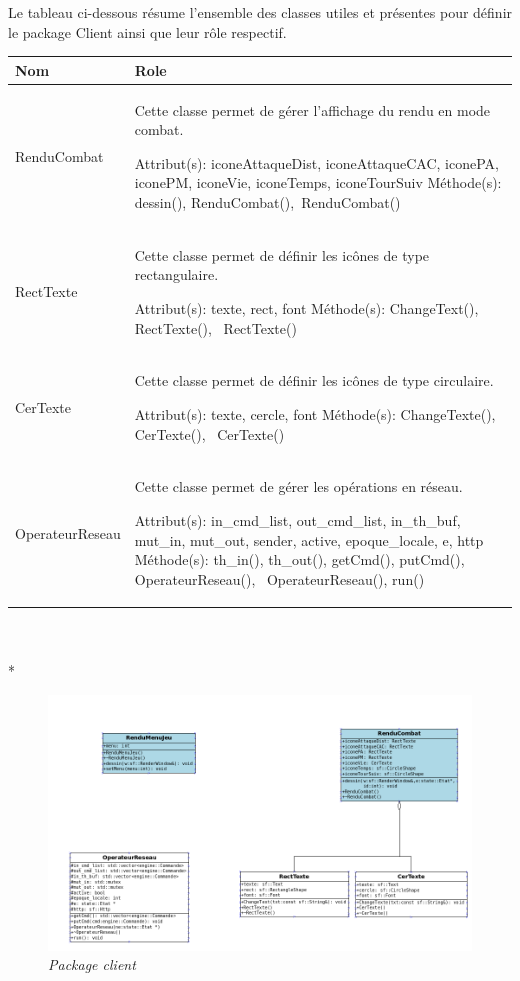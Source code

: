\documentclass[11pt, a4paper]{article}
\begin{document}
Le tableau ci-dessous résume l'ensemble des classes utiles et présentes pour définir le package Client ainsi que leur rôle respectif.\\

\begin{tabularx}{\textwidth}{ |l|X| }
\hline
   \textbf{Nom} & \textbf{Role}
 \\
\hline

   RenduCombat & Cette classe permet de gérer l'affichage du rendu en mode combat.
   
Attribut(s): iconeAttaqueDist, iconeAttaqueCAC, iconePA, iconePM, iconeVie, iconeTemps, iconeTourSuiv
\newline
Méthode(s): dessin(), RenduCombat(),~RenduCombat()
 \\
\hline

    RectTexte & Cette classe permet de définir les icônes de type rectangulaire.
    
Attribut(s): texte, rect, font
\newline
Méthode(s): ChangeText(), RectTexte(), ~RectTexte()
  \\
\hline

    CerTexte & Cette classe permet de définir les icônes de type circulaire.
    
Attribut(s): texte, cercle, font
\newline
Méthode(s): ChangeTexte(), CerTexte(), ~CerTexte()
  \\
\hline

    OperateurReseau & Cette classe permet de gérer les opérations en réseau.

Attribut(s): in\_cmd\_list, out\_cmd\_list, in\_th\_buf, mut\_in, mut\_out, sender, active, epoque\_locale, e, http
\newline
Méthode(s): th\_in(), th\_out(), getCmd(), putCmd(), OperateurReseau(), ~OperateurReseau(), run()
  \\
\hline

      
\end{tabularx}\\ \\*

\begin{figure}[H]
  \centering
  \includegraphics[scale=0.45]{img/package_Client.png}
  \caption{\emph{Package client}}
\end{figure}
\end{document}

